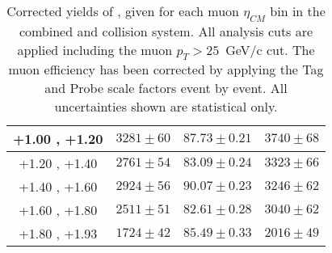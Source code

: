 \begin{table}[!h]
\begin{tabular}{|c|*3c|}
    \hline
    +1.00 , +1.20 & $3281 \pm 60$ & $87.73 \pm 0.21$ & $3740 \pm 68$\\
    \hline
    +1.20 , +1.40 & $2761 \pm 54$ & $83.09 \pm 0.24$ & $3323 \pm 66$\\
    \hline
    +1.40 , +1.60 & $2924 \pm 56$ & $90.07 \pm 0.23$ & $3246 \pm 62$\\
    \hline
    +1.60 , +1.80 & $2511 \pm 51$ & $82.61 \pm 0.28$ & $3040 \pm 62$\\
    \hline
    +1.80 , +1.93 & $1724 \pm 42$ & $85.49 \pm 0.33$ & $2016 \pm 49$\\
    \hline
  \end{tabular}
  \caption{Corrected yields of \WToMuNuMi, given for each muon $\eta_{CM}$ bin in the combined \pPb and \Pbp collision system. All analysis cuts are applied including the muon $p_{T} > 25$~GeV/c cut. The muon efficiency has been corrected by applying the Tag and Probe scale factors event by event. All uncertainties shown are statistical only.}
  \label{tab:CorrYields_WToMuMi_PA}
\end{table}


